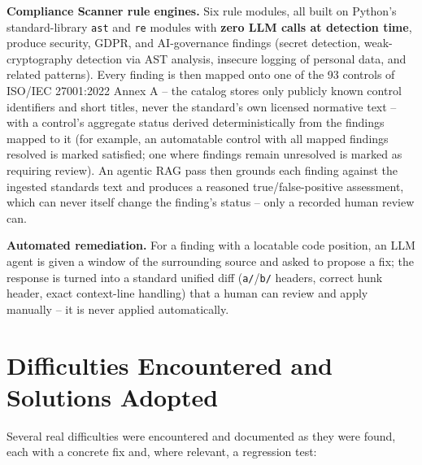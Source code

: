 \documentclass[12pt,a4paper]{report}
\begin{document}
\textbf{Compliance Scanner rule engines.} Six rule modules, all built on
Python's standard-library \texttt{ast} and \texttt{re} modules with
\textbf{zero \ac{LLM} calls at detection time}, produce security, \ac{GDPR},
and AI-governance findings (secret detection, weak-cryptography detection
via \ac{AST} analysis, insecure logging of personal data, and related
patterns). Every finding is then mapped onto one of the 93 controls of
ISO/IEC 27001:2022 Annex A -- the catalog stores only publicly known control
identifiers and short titles, never the standard's own licensed normative
text -- with a control's aggregate status derived deterministically from the
findings mapped to it (for example, an automatable control with all mapped
findings resolved is marked satisfied; one where findings remain
unresolved is marked as requiring review). An agentic \ac{RAG} pass then
grounds each finding against the ingested standards text and produces a
reasoned true/false-positive assessment, which can never itself change the
finding's status -- only a recorded human review can.

\textbf{Automated remediation.} For a finding with a locatable code
position, an \ac{LLM} agent is given a window of the surrounding source and
asked to propose a fix; the response is turned into a standard unified diff
(\texttt{a/}/\texttt{b/} headers, correct hunk header, exact context-line
handling) that a human can review and apply manually -- it is never applied
automatically.

\section{Difficulties Encountered and Solutions Adopted}

Several real difficulties were encountered and documented as they were
found, each with a concrete fix and, where relevant, a regression test:
\end{document}
